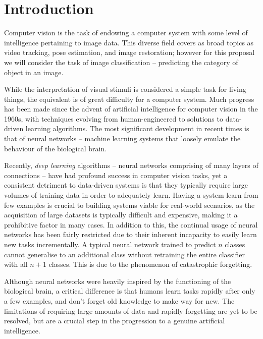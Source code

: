 \documentclass{report}
\begin{document}
\chapter{Introduction}
Computer vision is the task of endowing a computer system with some level of intelligence pertaining to image data. This diverse field covers as broad topics as video tracking, pose estimation, and image restoration; however for this proposal we will consider the task of image classification -- predicting the category of object in an image. \par
While the interpretation of visual stimuli is considered a simple task for living things, the equivalent is of great difficulty for a computer system. Much progress has been made since the advent of artificial intelligence for computer vision in the 1960s, with techniques evolving from human-engineered to solutions to data-driven learning algorithms. The most significant development in recent times is that of neural networks -- machine learning systems that loosely emulate the behaviour of the biological brain. \par
Recently, \emph{deep learning} algorithms -- neural networks comprising of many layers of connections -- have had profound success in computer vision tasks, yet a consistent detriment to data-driven systems is that they typically require large volumes of training data in order to adequately learn. Having a system learn from few examples is crucial to building systems viable for real-world scenarios, as the acquisition of large datasets is typically difficult and expensive, making it a prohibitive factor in many cases. In addition to this, the continual usage of neural networks has been fairly restricted due to their inherent incapacity to easily learn new tasks incrementally. A typical neural network trained to predict $n$ classes cannot generalise to an additional class without retraining the entire classifier with all $n+1$ classes. This is due to the phenomenon of catastrophic forgetting. \par
Although neural networks were heavily inspired by the functioning of the biological brain, a critical difference is that humans learn tasks rapidly after only a few examples, and don't forget old knowledge to make way for new. The limitations of requiring large amounts of data and rapidly forgetting are yet to be resolved, but are a crucial step in the progression to a genuine artificial intelligence. \par
\end{document}
